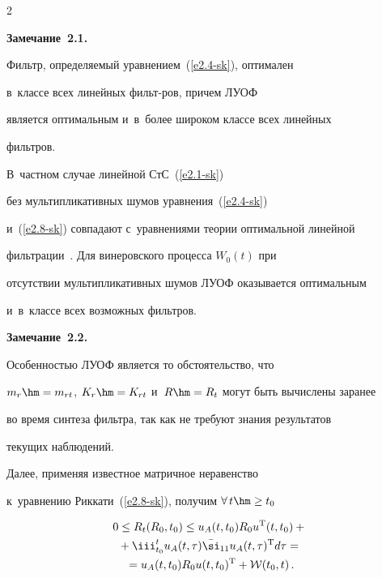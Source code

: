 \begin{multicols}{2}
\noindent

\textbf{Замечание~2.1.}

Фильтр, определяемый уравнением~(\ref{e2.4-sk}), оптимален

в~классе всех линейных фильт-\linebreak ров, причем ЛУОФ

является оптимальным и~в~более широком классе всех линейных

фильт\-ров.

 В~частном случае линейной СтС~(\ref{e2.1-sk})

 без мультипликативных шумов уравнения~(\ref{e2.4-sk})

 и~(\ref{e2.8-sk}) совпадают с~уравнениями теории оптимальной линейной

\mbox{фильтрации}~\cite{1-sk, 3-sk}. Для винеровского процесса  $W_0(t)$ при

отсутствии мультипликативных шумов ЛУОФ оказывается оптимальным

и~в~классе всех возможных фильтров.



\smallskip



\noindent

\textbf{Замечание~2.2.}

Особенностью ЛУОФ является то обстоятельство, что

$m_r\hm=m_{rt}$, $K_r\hm=K_{rt}$ и~$R\hm=R_t$ могут быть вычислены заранее

во время синтеза фильтра, так как не требуют знания результатов

текущих наблюдений.



Далее, применяя известное матричное неравенство~\cite{6-sk, 7-sk}

к~уравнению Риккати~(\ref{e2.8-sk}), получим  $\forall\, t\hm\ge t_0$



\noindent

\begin{multline*}

0\le R_t (R_0, t_0) \le u_A(t, t_0) R_0 u^{\mathrm{T}} (t, t_0) +{}\\

{}+

\iii_{t_0}^t u_A(t,\tau)  \bar \si_{11} u_A(t,\tau)^{\mathrm{T}} d\tau={}\\

{}=u_A(t, t_0) R_0 u (t, t_0)^{\mathrm{T}} + \mathcal{W}(t_0, t)\,. %


\end{multline*}
\end{multicols}
